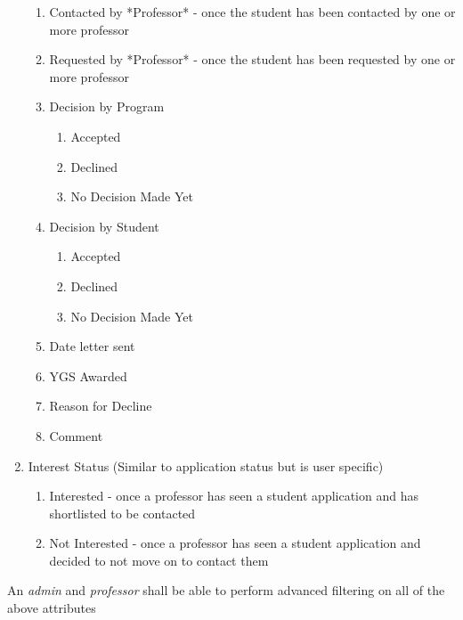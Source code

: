 \documentclass[fontsize=12pt,paper=letter,twoside]{scrartcl}
\begin{document}
\begin{mylist}
\begin{enumerate}
\begin{enumerate}
\item Contacted by *Professor* - once the student has been contacted by one or more professor
\item Requested by *Professor* - once the student has been requested by one or more professor
\item Decision by Program
\begin{enumerate} 
\item Accepted
\item Declined
\item No Decision Made Yet
\end{enumerate}
\item Decision by Student
\begin{enumerate}
\item Accepted
\item Declined
\item No Decision Made Yet
\end{enumerate}
\item Date letter sent
\item YGS Awarded
\item Reason for Decline
\item Comment
\end{enumerate}
\item Interest Status (Similar to application status but is user specific)
\begin{enumerate}
\item Interested - once a professor has seen a student application and has shortlisted to be contacted
\item Not Interested - once a professor has seen a student application and decided to not move on to contact them
\end{enumerate}
\end{enumerate}
\item An \emph{admin} and \emph{professor} shall be able to perform advanced filtering on all of the above attributes
\end{mylist}
\end{document}
